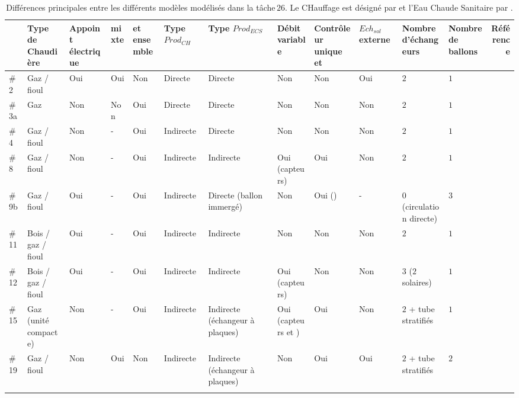 \begin{landscape}
\begin{table}
\centering
\small
\caption[Différences principales entre les différents modèles modélisés dans la tâche\,$26$]
        {Différences principales entre les différents modèles modélisés dans la tâche\,$26$.
         Le CHauffage est désigné par  et l’Eau Chaude Sanitaire par .}
\label{tab:diff_ssc}
\begin{tabular}{l C{2cm} C{1.5cm} C{0.6cm} C{1.4cm} C{1.7cm} C{1.7cm} C{1.2cm} C{1.5cm} C{1.2cm} C{2.5cm} C{1cm} r}
    \toprule
            & Type de Chaudière    & Appoint électrique  &  mixte  &  et  ensemble &
              Type $Prod_{CH}$ & Type $Prod_{ECS}$ & Débit  variable & Contrôleur unique  et  &
              $Ech_{sol}$ externe & Nombre d’échangeurs & Nombre de ballons & Référence                           \\
    \midrule
    \addlinespace[1.5\defaultaddspace]
    \#2 & Gaz / fioul & Oui & Oui & Non & Directe & Directe & Non & Non & Oui & $2$ & $1$ & \cite{Ellehauge2002}  \\
    \addlinespace[1.5\defaultaddspace]
    \#3a  & Gaz & Non & Non & Oui & Directe & Directe & Non & Non & Non & $2$ & $1$ & \cite{Cheze2002}  \\
    \addlinespace[1.5\defaultaddspace]
    \#4 & Gaz /  fioul  & Non & - & Oui & Indirecte & Directe & Non & Non & Non & $2$ & $1$ & \cite{Shah2002} \\
    \addlinespace[1.5\defaultaddspace]
    \#8 & Gaz / fioul & Non & - & Oui & Indirecte & Indirecte & Oui (capteurs)  & Oui & Non & $2$ & $1$ & \cite{Bony2002} \\
    \addlinespace[1.5\defaultaddspace]
    \#9b  & Gaz / fioul & Oui & - & Oui & Indirecte & Directe (ballon immergé)  & Non & Oui ()  & - & $0$ (circulation directe) & $3$ & \cite{Peter2003}  \\
    \addlinespace[1.5\defaultaddspace]
    \#11  & Bois / gaz / fioul  & Oui & - & Oui & Indirecte & Indirecte & Non & Non & Non & $2$ & $1$ & \cite{Bales2002}  \\
    \addlinespace[1.5\defaultaddspace]
    \#12  & Bois / gaz / fioul  & Oui & - & Oui & Indirecte & Indirecte & Oui (capteurs)  & Non & Non & $3$ ($2$ solaires)  & $1$ & \cite{Bales2002a} \\
    \addlinespace[1.5\defaultaddspace]
    \#15  & Gaz (unité compacte)  & Non & - & Oui & Indirecte & Indirecte (échangeur à plaques)  & Oui (capteurs et )  & Oui  & Non & $2$ + tube stratifiés & $1$ & \cite{Jaehnig2002}  \\
    \addlinespace[1.5\defaultaddspace]
    \#19  & Gaz / fioul & Non & Oui & Non & Indirecte & Indirecte (échangeur à plaques)  & Non & Oui & Oui & $2$ + tube stratifiés & $2$ & \cite{Heimrath2003} \\
    \addlinespace[1.5\defaultaddspace]
    \bottomrule
\end{tabular}
\end{table}
\end{landscape}


